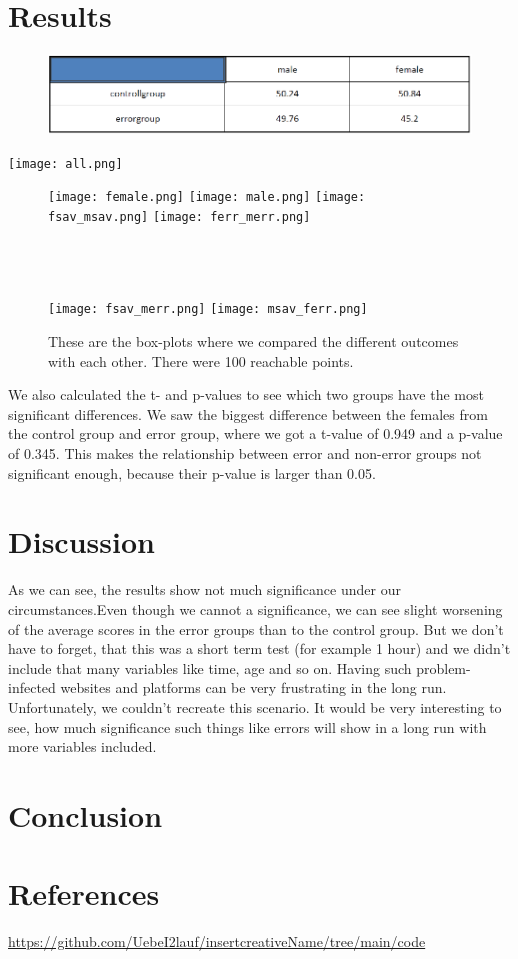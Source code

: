 \documentclass[12pt, a4paper]{article}
\begin{document}
\section{Results}
\begin{figure}[h]
    \includegraphics[width=\textwidth]{results.PNG}
\end{figure}
\begin{center}
    \texttt{[image: all.png]}
\end{center}
\begin{figure}[h]
    \texttt{[image: female.png]}
    \texttt{[image: male.png]}
    \texttt{[image: fsav\_msav.png]}
    \texttt{[image: ferr\_merr.png]}\\\\\\\\
\end{figure}
\begin{figure}[h]
    \texttt{[image: fsav\_merr.png]}
    \texttt{[image: msav\_ferr.png]}
    \caption{These are the box-plots where we compared the different outcomes with each other. There were 100 reachable points.}
\end{figure}
We also calculated the t- and p-values to see which two groups have the most significant differences. 
We saw the biggest difference between the females from the control group and error group, where we 
got a t-value of 0.949 and a p-value of 0.345. This makes the relationship between error and 
non-error groups not significant enough, because their p-value is larger than 0.05.   

\section{Discussion}
As we can see, the results show not much significance under our circumstances.Even though we cannot a significance, we can see slight worsening of the average scores in the error groups than to the control group. But we don't have to forget, that this was a short term test (for example 1 hour) and we didn't include that many variables like time, age and so on. Having such problem-infected websites and platforms can be very frustrating in the long run. Unfortunately, we couldn't recreate this scenario. It would be very interesting to see, how much significance such things like errors will show  in a long run with more variables included.           
\section{Conclusion}
\section{References}
\url{https://github.com/UebeI2lauf/insertcreativeName/tree/main/code}
\end{document}
